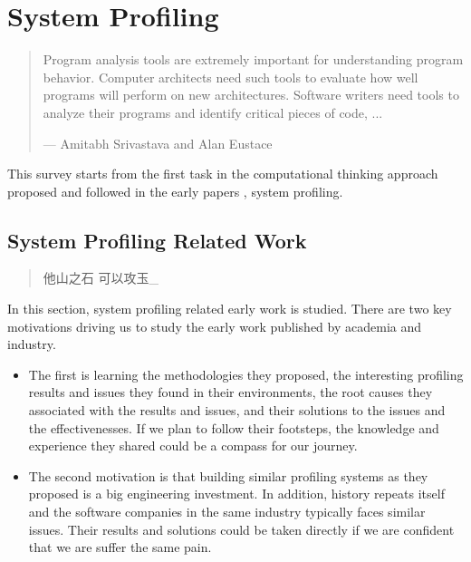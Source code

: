 \section{System Profiling}

\begin{quote}
    Program analysis tools are extremely important for understanding program behavior. Computer architects need such tools to evaluate how well programs will perform on new architectures. Software writers need tools to analyze their programs and identify critical pieces of code, ... \autocite{DBLP:conf/pldi/SrivastavaE94} \linebreak[2]

                                                --- Amitabh Srivastava and Alan Eustace
\end{quote}

This survey starts from the first task in the computational thinking approach proposed and followed in the early papers \autocite{DBLP:journals/cacm/Wing06, DBLP:journals/micro/RenTMSRH10}, system profiling.


\subsection{System Profiling Related Work}

\begin{quote}
他山之石 可以攻玉_
\end{quote}

In this section, system profiling related early work is studied. There are two key motivations driving us to study the early work published by academia and industry.
\begin{itemize}
  \item The first is learning the methodologies they proposed, the interesting profiling results and issues they found in their environments, the root causes they associated with the results and issues, and their solutions to the issues and the effectivenesses. If we plan to follow their footsteps, the knowledge and experience they shared could be a compass for our journey.
  \item The second motivation is that building similar profiling systems as they proposed is a big engineering investment. In addition, history repeats itself and the software companies in the same industry typically faces similar issues. Their results and solutions could be taken directly if we are confident that we are suffer the same pain.
\end{itemize}

